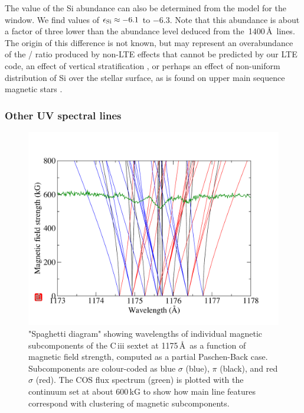\documentclass[fleqn,usenatbib]{mnras}
\begin{document}

The value of the Si abundance  can also be determined from the model for the  window.  We find values of $\epsilon_{\rm Si} \approx -6.1$ to $-6.3$. Note that this abundance is about a factor of three lower than the abundance level deduced from the \,1400\,\AA\ lines. The origin of this difference is not known, but may represent an overabundance of the / ratio produced by non-LTE effects that cannot be predicted by our LTE code, an effect of vertical stratification \citep{koesteretal14-1}, or perhaps an effect of non-uniform distribution of Si over the stellar surface, as is found on upper main sequence magnetic stars \citep[see for e.g.][]{krtickaetal19-1}.

\subsubsection{Other UV spectral lines}


\begin{figure}
    \centering
    \includegraphics[width=9 cm]{ciii_ppe_obs.pdf}
    \caption{"Spaghetti diagram" showing wavelengths of individual magnetic subcomponents of the C\,{\sc iii} sextet at 1175\,\AA\ as a function of magnetic field strength, computed as a partial Paschen-Back case. Subcomponents are colour-coded as blue $\sigma$ (blue), $\pi$ (black), and red $\sigma$ (red). The COS flux spectrum (green) is plotted with the continuum set at about 600\,kG to show how main line features correspond with clustering of magnetic subcomponents.}
    \label{fig:ciii_ppe_obs}
\end{figure}
\end{document}
